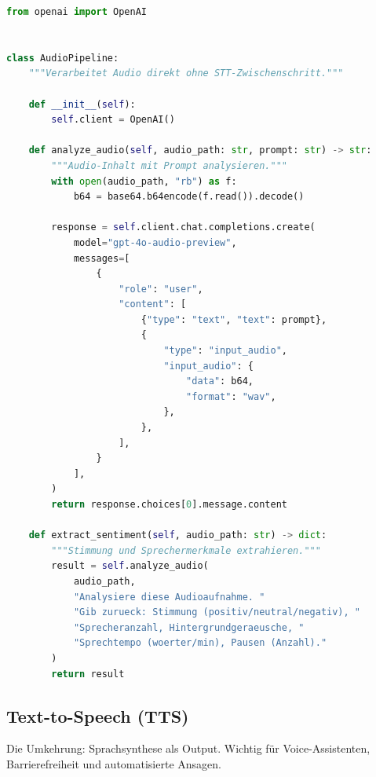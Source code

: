 \begin{lstlisting}[language=Python, caption=Direkte Audio-Verarbeitung (GPT-4o-Audio)]
from openai import OpenAI


class AudioPipeline:
    """Verarbeitet Audio direkt ohne STT-Zwischenschritt."""

    def __init__(self):
        self.client = OpenAI()

    def analyze_audio(self, audio_path: str, prompt: str) -> str:
        """Audio-Inhalt mit Prompt analysieren."""
        with open(audio_path, "rb") as f:
            b64 = base64.b64encode(f.read()).decode()

        response = self.client.chat.completions.create(
            model="gpt-4o-audio-preview",
            messages=[
                {
                    "role": "user",
                    "content": [
                        {"type": "text", "text": prompt},
                        {
                            "type": "input_audio",
                            "input_audio": {
                                "data": b64,
                                "format": "wav",
                            },
                        },
                    ],
                }
            ],
        )
        return response.choices[0].message.content

    def extract_sentiment(self, audio_path: str) -> dict:
        """Stimmung und Sprechermerkmale extrahieren."""
        result = self.analyze_audio(
            audio_path,
            "Analysiere diese Audioaufnahme. "
            "Gib zurueck: Stimmung (positiv/neutral/negativ), "
            "Sprecheranzahl, Hintergrundgeraeusche, "
            "Sprechtempo (woerter/min), Pausen (Anzahl)."
        )
        return result
\end{lstlisting}

\subsection{Text-to-Speech (TTS)}

Die Umkehrung: Sprachsynthese als Output. Wichtig für Voice-Assistenten, Barrierefreiheit und automatisierte Ansagen.

